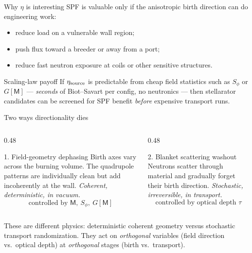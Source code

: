 \documentclass[aspectratio=169]{beamer}
\newcommand{\M}{\mathsf M}
\newcommand{\Sphi}{S_\phi}
\begin{document}
\begin{frame}[t]{Why $\eta$ is interesting}
SPF is valuable only if the anisotropic birth direction can do engineering work:
\begin{itemize}
  \item reduce load on a vulnerable wall region;
  \item push flux toward a breeder or away from a port;
  \item reduce fast neutron exposure at coils or other sensitive structures.
\end{itemize}
\vspace{0.5em}
\begin{block}{Scaling-law payoff}
If $\eta_{\rm source}$ is predictable from cheap field statistics such as $\Sphi$ or $G[\M]$ --- \emph{seconds} of Biot--Savart per config, no neutronics --- then stellarator candidates can be screened for SPF benefit \emph{before} expensive transport runs.
\end{block}
\end{frame}

\begin{frame}[t]{Two ways directionality dies}
\begin{columns}[T]
\begin{column}{0.48\textwidth}
\begin{block}{1. Field-geometry dephasing}
Birth axes vary across the burning volume. The quadrupole patterns are individually clean but add incoherently at the wall. \emph{Coherent, deterministic, in vacuum.}
\[
\text{controlled by }\M,\ \Sphi,\ G[\M]
\]
\end{block}
\end{column}
\begin{column}{0.48\textwidth}
\begin{block}{2. Blanket scattering washout}
Neutrons scatter through material and gradually forget their birth direction. \emph{Stochastic, irreversible, in transport.}
\[
\text{controlled by optical depth }\tau
\]
\end{block}
\end{column}
\end{columns}
\vspace{0.8em}
These are different physics: deterministic coherent geometry versus stochastic transport randomization. They act on \emph{orthogonal} variables (field direction vs.\ optical depth) at \emph{orthogonal} stages (birth vs.\ transport).
\end{frame}
\end{document}
